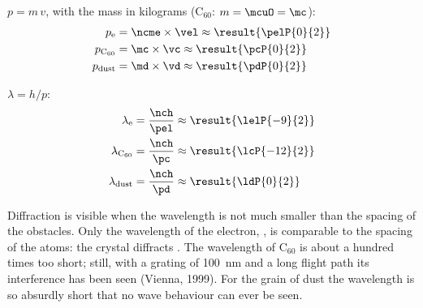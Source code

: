 \begin{abcliste}
\abc $p = m\,v$, with the mass in kilograms (C$_{60}$: $m = \mcuO = \mc$):
\begin{align}
 p_\mathrm{e} &= \ncme\times\vel \approx \result{\pelP{0}{2}} \\
 p_\mathrm{C_{60}} &= \mc\times\vc \approx \result{\pcP{0}{2}} \\
 p_\mathrm{dust} &= \md\times\vd \approx \result{\pdP{0}{2}}
\end{align}

\abc $\lambda = h/p$:
\begin{align}
 \lambda_\mathrm{e} &= \frac{\nch}{\pel} \approx \result{\lelP{-9}{2}} \\
 \lambda_\mathrm{C_{60}} &= \frac{\nch}{\pc} \approx \result{\lcP{-12}{2}} \\
 \lambda_\mathrm{dust} &= \frac{\nch}{\pd} \approx \result{\ldP{0}{2}}
\end{align}

\abc Diffraction is visible when the wavelength is not much smaller than the spacing of the obstacles. Only the wavelength of the electron, , is comparable to the spacing of the atoms: the crystal diffracts . The wavelength of C$_{60}$ is about a hundred times too short; still, with a grating of \SI{100}{\nano\meter} and a long flight path its interference has been seen (Vienna, 1999). For the grain of dust the wavelength is so absurdly short that no wave behaviour can ever be seen.
\end{abcliste}
